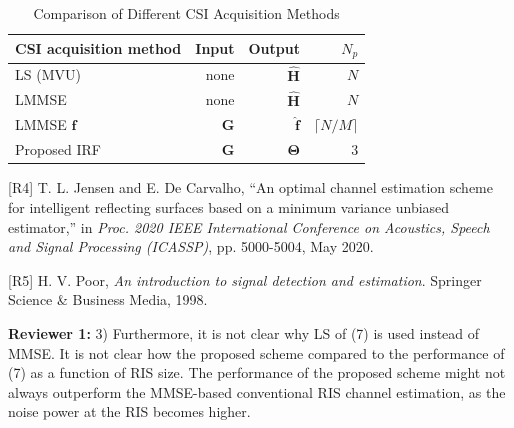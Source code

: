 \documentclass[a4paper,12pt]{article}
\newcommand{\red}[1]{{\color{red}{#1}}}
\begin{document}
{{\begin{table}[h]
    \color{blue}
    \caption{Comparison of Different CSI Acquisition Methods}
    \label{tab:comp CE}
    \centering
    \begin{tabular}{|l|r|r|r|}
        \hline 
        CSI acquisition method & Input & Output & $N_p$ \\ 
        \hline
        LS (MVU)        & none    & $\hat{\bm H}$ & $N$  \\
        \hline
        LMMSE  & none & $\hat{\bm H}$ & $N$  \\
        \hline
        LMMSE $\bm f$ &  ${\bm G}$        & $\hat{\bm f}$ & $\lceil N/M\rceil$ \\
        \hline 
        Proposed IRF & $\bm G$ & $\bm \Theta$ & 3  \\
        \hline 
    \end{tabular}
\end{table}

\red{Revisions in the paper. }

[R4] T. L. Jensen and E. De Carvalho, ``An optimal channel estimation scheme for intelligent reflecting surfaces based on a minimum variance unbiased estimator,'' in {\it Proc. 2020 IEEE International Conference on Acoustics, Speech and Signal Processing (ICASSP)}, pp. 5000-5004, May 2020. 

[R5] H. V. Poor, {\it An introduction to signal detection and estimation}. Springer Science \& Business Media, 1998. 
}}

\textbf{Reviewer 1:}
3) Furthermore, it is not clear why LS of (7) is used instead of MMSE. It is not clear how the proposed scheme compared to the performance of (7) as a function of RIS size. The performance of the proposed scheme might not always outperform the MMSE-based conventional RIS channel estimation, as the noise power at the RIS becomes higher. 
\end{document}
